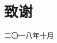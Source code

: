 {\kaishu
{\chapter*{\vspace{-3cm} 致\qquad 谢}}

\vspace{-0.5cm}

\begin{center} 
\end{center}
	
	
\vspace{0.2cm} \hspace{11.5cm} 

\hspace{10.6cm}  二〇一八年十月 }
